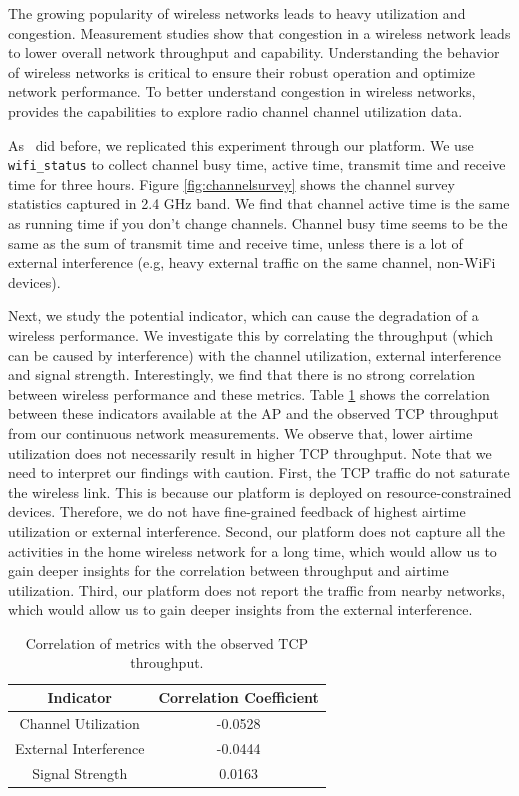 The growing popularity of wireless networks leads to heavy utilization and congestion. Measurement studies show that congestion in a wireless network leads to lower overall network throughput and capability. Understanding the behavior of wireless networks is critical to ensure their robust operation and optimize network performance. To better understand congestion in wireless networks, \sysname provides the capabilities to explore radio channel channel utilization data. 

As~\cite{channelsurvey} did before, we replicated this experiment through our \sysname platform. We use \texttt{wifi\_status} to collect channel busy time, active time, transmit time and receive time for three hours. Figure \ref{fig:channelsurvey} shows the channel survey statistics captured in 2.4 GHz band. We find that channel active time is the same as running time if you don't change channels. Channel busy time seems to be the same as the sum of transmit time and receive time, unless there is a lot of external interference (e.g, heavy external traffic on the same channel, non-WiFi devices).

Next, we study the potential indicator, which can cause the degradation of a wireless performance. We investigate this by correlating the throughput (which can be caused by interference) with the channel utilization, external interference and signal strength. Interestingly, we find that there is no strong correlation between wireless performance and these metrics. Table \ref{table: Correlation} shows the correlation between these indicators available at the AP and the observed TCP throughput from our continuous network measurements. We observe that, lower airtime utilization does not necessarily result in higher TCP throughput. Note that we need to interpret our findings with caution. First, the TCP traffic do not saturate the wireless link. This is because our platform is deployed on resource-constrained devices. Therefore, we do not have fine-grained feedback of highest airtime utilization or external interference. Second, our platform does not capture all the activities in the home wireless network for a long time, which would allow us to gain deeper insights for the correlation between throughput and airtime utilization. Third, our platform does not report the traffic from nearby networks, which would allow us to gain deeper insights from the external interference.

\begin{table}[]
\centering
\begin{tabular}{ |c|c| }
\hline
Indicator               & Correlation Coefficient  \\ 
\hline
Channel Utilization               &-0.0528  \\ 
\hline
External Interference & -0.0444 \\ 
\hline
Signal Strength & 0.0163 \\
\hline
\end{tabular}
\caption{Correlation of metrics with the observed TCP throughput.}
\label{table: Correlation}
\end{table}

